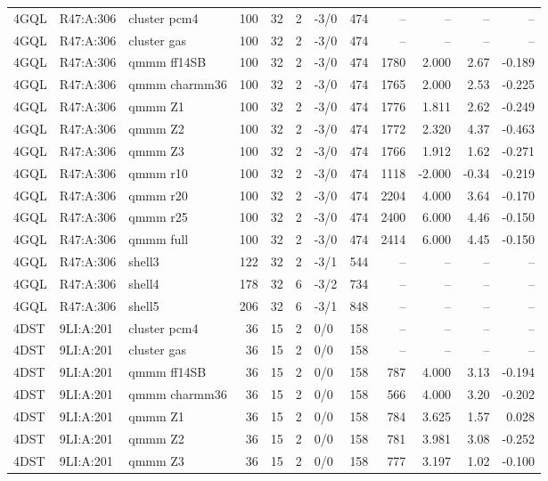 {\begin{longtable}{lllrrrlrrrrr}
4GQL & R47:A:306 & cluster pcm4 & 100 & 32 & 2 & -3/0 & 474 & -- & -- & -- & --\\
4GQL & R47:A:306 & cluster gas & 100 & 32 & 2 & -3/0 & 474 & -- & -- & -- & --\\
4GQL & R47:A:306 & qmmm ff14SB & 100 & 32 & 2 & -3/0 & 474 & 1780 & 2.000 & 2.67 & -0.189\\
4GQL & R47:A:306 & qmmm charmm36 & 100 & 32 & 2 & -3/0 & 474 & 1765 & 2.000 & 2.53 & -0.225\\
4GQL & R47:A:306 & qmmm Z1 & 100 & 32 & 2 & -3/0 & 474 & 1776 & 1.811 & 2.62 & -0.249\\
4GQL & R47:A:306 & qmmm Z2 & 100 & 32 & 2 & -3/0 & 474 & 1772 & 2.320 & 4.37 & -0.463\\
4GQL & R47:A:306 & qmmm Z3 & 100 & 32 & 2 & -3/0 & 474 & 1766 & 1.912 & 1.62 & -0.271\\
4GQL & R47:A:306 & qmmm r10 & 100 & 32 & 2 & -3/0 & 474 & 1118 & -2.000 & -0.34 & -0.219\\
4GQL & R47:A:306 & qmmm r20 & 100 & 32 & 2 & -3/0 & 474 & 2204 & 4.000 & 3.64 & -0.170\\
4GQL & R47:A:306 & qmmm r25 & 100 & 32 & 2 & -3/0 & 474 & 2400 & 6.000 & 4.46 & -0.150\\
4GQL & R47:A:306 & qmmm full & 100 & 32 & 2 & -3/0 & 474 & 2414 & 6.000 & 4.45 & -0.150\\
4GQL & R47:A:306 & shell3 & 122 & 32 & 2 & -3/1 & 544 & -- & -- & -- & --\\
4GQL & R47:A:306 & shell4 & 178 & 32 & 6 & -3/2 & 734 & -- & -- & -- & --\\
4GQL & R47:A:306 & shell5 & 206 & 32 & 6 & -3/1 & 848 & -- & -- & -- & --\\
4DST & 9LI:A:201 & cluster pcm4 & 36 & 15 & 2 & 0/0 & 158 & -- & -- & -- & --\\
4DST & 9LI:A:201 & cluster gas & 36 & 15 & 2 & 0/0 & 158 & -- & -- & -- & --\\
4DST & 9LI:A:201 & qmmm ff14SB & 36 & 15 & 2 & 0/0 & 158 & 787 & 4.000 & 3.13 & -0.194\\
4DST & 9LI:A:201 & qmmm charmm36 & 36 & 15 & 2 & 0/0 & 158 & 566 & 4.000 & 3.20 & -0.202\\
4DST & 9LI:A:201 & qmmm Z1 & 36 & 15 & 2 & 0/0 & 158 & 784 & 3.625 & 1.57 & 0.028\\
4DST & 9LI:A:201 & qmmm Z2 & 36 & 15 & 2 & 0/0 & 158 & 781 & 3.981 & 3.08 & -0.252\\
4DST & 9LI:A:201 & qmmm Z3 & 36 & 15 & 2 & 0/0 & 158 & 777 & 3.197 & 1.02 & -0.100\\

\end{longtable}}
